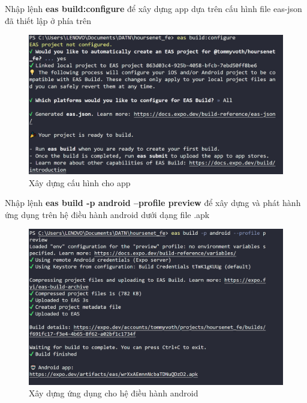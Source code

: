 Nhập lệnh \textbf{eas build:configure} để xây dựng app dựa trên cấu hình file eas-json đã thiết lập ở phía trên
\begin{figure}[H]
    \centering
    \includegraphics[width=1\textwidth]{Images/Build_app/build_configure.png}
    \caption{Xây dựng cấu hình cho app}
\end{figure}
Nhập lệnh \textbf{eas build -p android --profile preview} để xây dựng và phát hành ứng dụng trên hệ điều hành android dưới dạng file .apk
\begin{figure}[H]
    \centering
    \includegraphics[width=1\textwidth]{Images/Build_app/build_android.png}
    \caption{Xây dựng ứng dụng cho hệ điều hành android}
\end{figure}